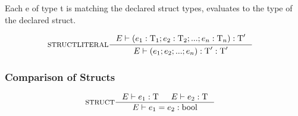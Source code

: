 Each e of type t is matching the declared struct types, evaluates to the type of the declared struct.

\begin{align*}
&\inference[STRUCTLITERAL]{\Tenv (e_1 : \Tt_1;e_2 : \Tt_2;...;e_n : \Tt_n):\Tt'}
                 {\Tenv \mathbin{\text{(}} e_1; e_2;...;e_n\mathbin{\text{)}}:\Tt': \Tt'}
\end{align*}

\subsubsection{Comparison of Structs}
\begin{align*}
&\inference[STRUCT]{\Tenv e_1: \Tt & \Tenv e_2: \Tt}
                 {\Tenv e_1 = e_2: \Tbool}
\end{align*}
